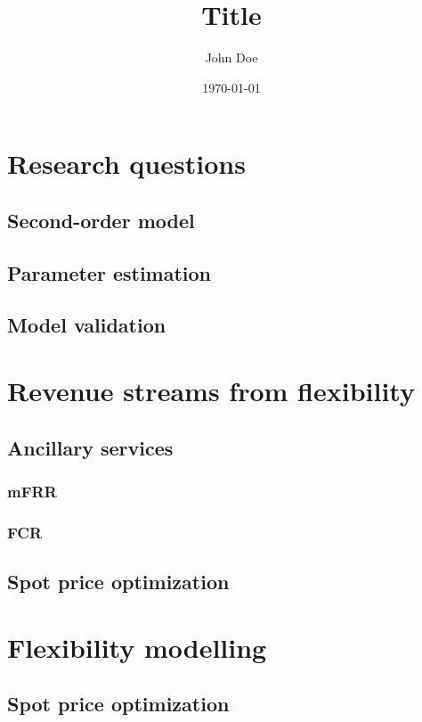 \documentclass[11pt,a4paper]{article}
\begin{document}
\title{Title}
\author{John Doe}
\date{\today}
\maketitle
\tableofcontents

\section*{Research questions}

\subsection{Second-order model}

\subsection{Parameter estimation}

\subsection{Model validation}

\section{Revenue streams from flexibility}

\subsection{Ancillary services}

\subsubsection{mFRR}

\subsubsection{FCR}

\subsection{Spot price optimization}

\section{Flexibility modelling}

\subsection{Spot price optimization}
\end{document}
